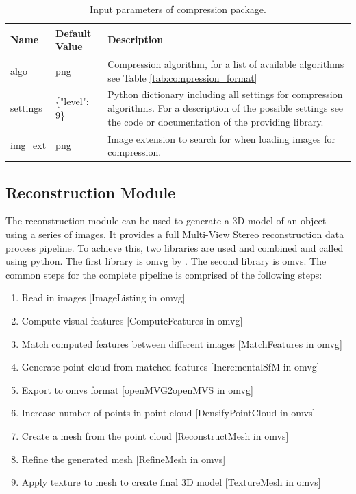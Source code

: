 \begin{table}[htpb]
    \caption{Input parameters of compression package.}
    \label{tab:compression_settings}
    \begin{tabular}{p{}|p{}|p{}}
        \textbf{Name} & \textbf{Default Value} & \textbf{Description} \\ \hline
        algo    & png          & Compression algorithm, for a list of available algorithms see Table \ref{tab:compression_format}\\
        settings    & \{"level": 9\} & Python dictionary including all settings for compression algorithms. For a description of the possible settings see the code or documentation of the providing library. \\
        img\_ext    & png          & Image extension to search for when loading images for compression. 
    \end{tabular}
\end{table}

\subsection{Reconstruction Module}
The reconstruction module can be used to generate a 3D model of an object using a series of images. It provides a full Multi-View Stereo reconstruction data process pipeline. To achieve this, two libraries are used and combined and called using python. The first library is \gls{omvg} by \cite{openMVG}. The second library is \gls{omvs}. 
The common steps for the complete pipeline is comprised of the following steps:
\begin{enumerate}
    \item Read in images [ImageListing in \gls{omvg}]
    \item Compute visual features [ComputeFeatures in \gls{omvg}]
    \item Match computed features between different images [MatchFeatures in \gls{omvg}]
    \item Generate point cloud from matched features [IncrementalSfM in \gls{omvg}]
    \item Export to \gls{omvs} format [openMVG2openMVS in \gls{omvg}]
    \item Increase number of points in point cloud [DensifyPointCloud in \gls{omvs}]
    \item Create a mesh from the point cloud [ReconstructMesh in \gls{omvs}]
    \item Refine the generated mesh [RefineMesh in \gls{omvs}]
    \item Apply texture to mesh to create final 3D model [TextureMesh in \gls{omvs}]
\end{enumerate}

